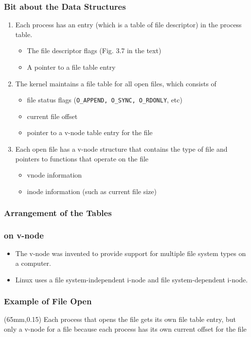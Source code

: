 \documentclass[newPxFont,sthlmFooter,nooffset]{beamer}
\begin{document}
\begin{frame}
  \frametitle{Bit about the Data Structures}
\begin{enumerate}
\item Each process has an entry (which is a table of file descriptor) in the process table.
  \begin{itemize}
  \item The file descriptor flags (Fig. 3.7 in the text)
  \item A pointer to a file table entry
  \end{itemize}
\item The kernel maintains a file table for all open files, which consists of
  \begin{itemize}
  \item file status flags (\texttt{O\_APPEND, O\_SYNC, O\_RDONLY}, etc)
  \item current file offset
  \item pointer to a v-node table entry for the file
  \end{itemize}
\item Each open file has a v-node structure that contains the type of file and pointers to functions that operate on the file
  \begin{itemize}
  \item vnode information
  \item inode information (such as current file size)
  \end{itemize}
\end{enumerate}
\end{frame}

\begin{frame}
  \frametitle{Arrangement of the Tables}
\centering
{}

\end{frame}


\begin{frame}[t]
  \frametitle{on v-node}
\begin{itemize}
\item The v-node was invented to provide support for multiple file system types on a computer.
\item Linux uses a file system-independent i-node and file system-dependent i-node.
\end{itemize}
\end{frame}

\begin{frame}
  \frametitle{Example of File Open}
\centering
{}
\begin{textblock*}{60mm}(65mm,0.15\textheight)
{\footnotesize Each process that opens the file gets its own file table entry, but only a v-node for a file because each process has its own current offset for the file }
\end{textblock*}
\end{frame}
\end{document}
